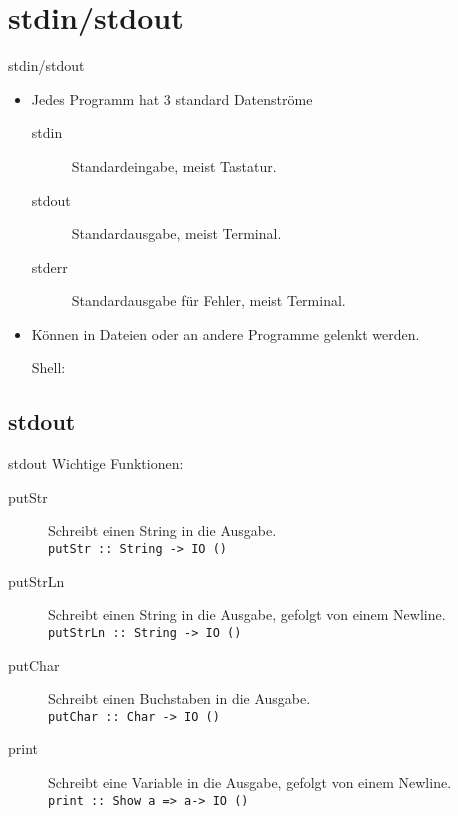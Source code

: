 \documentclass{beamer}
\begin{document}
\section{stdin/stdout}
\begin{frame}[<+->][fragile]{stdin/stdout}
\begin{itemize}
\item Jedes Programm hat 3 standard Datenströme
\begin{small}
\begin{description}
\item[stdin] Standardeingabe, meist Tastatur.
\item[stdout] Standardausgabe, meist Terminal.
\item[stderr] Standardausgabe für Fehler, meist Terminal.
\end{description}
\end{small}
\item Können in Dateien oder an andere Programme gelenkt werden.
\begin{block}{Shell:}
\end{block}
\end{itemize}
\end{frame}

\subsection{stdout}
\begin{frame}[<+->]{stdout}
Wichtige Funktionen:
\begin{description}
\item[putStr] Schreibt einen String in die Ausgabe. \\ \texttt{putStr :: String -> IO ()}
\item[putStrLn] Schreibt einen String in die Ausgabe, gefolgt von einem Newline. \\ \texttt{putStrLn :: String -> IO ()}
\item[putChar] Schreibt einen Buchstaben in die Ausgabe. \\ \texttt{putChar :: Char -> IO ()}
\item[print] Schreibt eine Variable in die Ausgabe, gefolgt von einem Newline. \\ \texttt{print :: Show a => a-> IO ()}
\end{description}
\end{frame}
\end{document}
